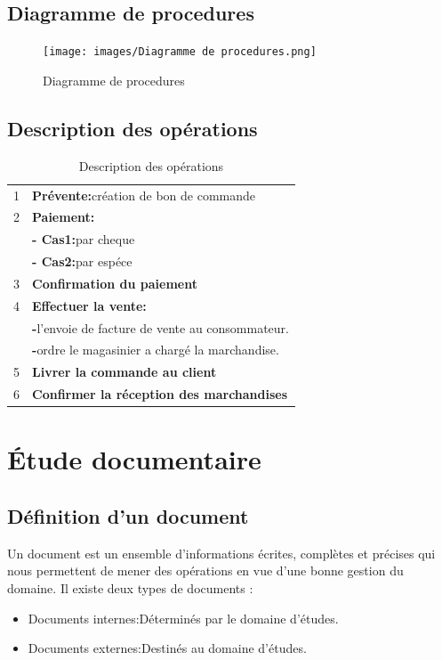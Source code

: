 \documentclass[edit,12pt,a4paper,ChapStyle,oneside,doubleinterligne]{report}
\begin{document}
\subsection{Diagramme de procedures}
\begin{figure}[h!]\label{fig:procedures}
\centering
\texttt{[image: images/Diagramme de procedures.png]}
\caption{Diagramme de procedures}
\end{figure}
\subsection{Description des opérations}
\begin{table}[h!]
    \centering
    \begin{tabular}{|c|l|}
        \hline
        1 & \textbf{Prévente:}création de bon de commande \\
        2 & \textbf{Paiement:} \\
          & \textbf{- Cas1:}par cheque \\
          & \textbf{- Cas2:}par espéce \\
        3 & \textbf{Confirmation du paiement} \\
        4 & \textbf{Effectuer la vente: } \\
          & \textbf{-}l’envoie de facture de vente au consommateur. \\
          & \textbf{-}ordre le magasinier a chargé la marchandise. \\
        5 & \textbf{Livrer la commande au client} \\
        6 & \textbf{Confirmer la réception des marchandises} \\
       \hline
    \end{tabular}
    \caption{Description des opérations}
    \label{tab:auxiliaire Description des opérations}
\end{table}
\section{Étude documentaire}
\subsection{Définition d’un document }
Un document est un ensemble d'informations écrites, complètes et précises qui nous permettent de mener des opérations en vue d'une bonne gestion du domaine. Il existe deux types de documents :
\begin{itemize}
    \item Documents internes:Déterminés par le domaine d'études.
    \item Documents externes:Destinés au domaine d'études.
\end{itemize}
\end{document}
